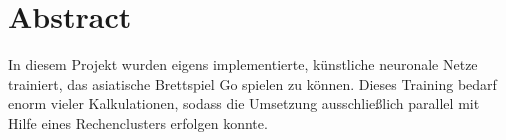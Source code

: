 \section*{Abstract}
In diesem Projekt wurden eigens implementierte, künstliche neuronale Netze
trainiert, das asiatische Brettspiel Go spielen zu können. Dieses Training
bedarf enorm vieler Kalkulationen, sodass die Umsetzung ausschließlich parallel
mit Hilfe eines Rechenclusters erfolgen konnte.
